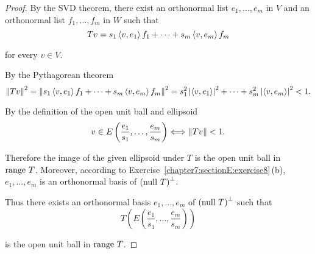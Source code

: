 \begin{proof}
    By the SVD theorem, there exist an orthonormal list $e_{1}, \ldots, e_{m}$ in $V$ and an orthonormal list $f_{1}, \ldots, f_{m}$ in $W$ such that
    \[
        Tv = s_{1}\left\langle{v,e_{1}}\right\rangle f_{1} + \cdots + s_{m}\left\langle{v,e_{m}}\right\rangle f_{m}
    \]

    for every $v\in V$.

    By the Pythagorean theorem
    \[
        \left\Vert{Tv}\right\Vert^{2} = \left\Vert{s_{1}\left\langle{v,e_{1}}\right\rangle f_{1} + \cdots + s_{m}\left\langle{v,e_{m}}\right\rangle f_{m}}\right\Vert^{2} = s_{1}^{2}\left\vert{\left\langle{v, e_{1}}\right\rangle}\right\vert^{2} + \cdots + s_{m}^{2}\left\vert{\left\langle{v, e_{m}}\right\rangle}\right\vert^{2} < 1.
    \]

    By the definition of the open unit ball and ellipsoid
    \[
        v\in E\left(\frac{e_{1}}{s_{1}}, \ldots, \frac{e_{m}}{s_{m}}\right) \Longleftrightarrow \left\Vert{Tv}\right\Vert < 1.
    \]

    Therefore the image of the given ellipsoid under $T$ is the open unit ball in $\operatorname{range}\,{T}$. Moreover, according to Exercise~\ref{chapter7:sectionE:exercise8}\,(b), $e_{1}, \ldots, e_{m}$ is an orthonormal basis of ${(\operatorname{null}\,{T})}^{\bot}$.

    Thus there exists an orthonormal basis $e_{1}, \ldots, e_{m}$ of ${(\operatorname{null}\,{T})}^{\bot}$ such that
    \[
        T\left( E\left( \frac{e_{1}}{s_{1}}, \ldots, \frac{e_{m}}{s_{m}} \right) \right)
    \]

    is the open unit ball in $\operatorname{range}\,{T}$.
\end{proof}
\newpage
